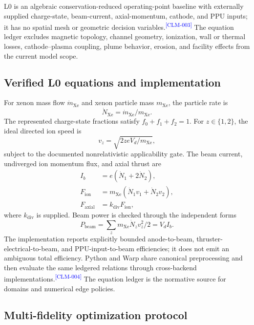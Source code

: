 \documentclass[11pt]{article}
\newcommand{\EvidenceClaim}[2]{#2\textsuperscript{\textcolor{blue}{[#1]}}}
\begin{document}
\EvidenceClaim{CLM-003}{L0 is an algebraic conservation-reduced operating-point
baseline with externally supplied charge-state, beam-current, axial-momentum,
cathode, and PPU inputs; it has no spatial mesh or geometric decision
variables.} The equation ledger excludes magnetic topology, channel geometry,
ionization, wall or thermal losses, cathode--plasma coupling, plume behavior,
erosion, and facility effects from the current model scope.

\subsection{Verified L0 equations and implementation}

For xenon mass flow $\dot m_{\mathrm{Xe}}$ and xenon particle mass
$m_{\mathrm{Xe}}$, the particle rate is
\begin{equation}
  \dot N_{\mathrm{Xe}} = \dot m_{\mathrm{Xe}}/m_{\mathrm{Xe}}.
\end{equation}
The represented charge-state fractions satisfy
$f_0+f_1+f_2=1$. For $z\in\{1,2\}$, the ideal directed ion speed is
\begin{equation}
  v_z = \sqrt{2 z e V_d/m_{\mathrm{Xe}}},
\end{equation}
subject to the documented nonrelativistic applicability gate. The beam current,
undiverged ion momentum flux, and axial thrust are
\begin{align}
  I_b &= e(\dot N_1+2\dot N_2),\\
  F_{\mathrm{ion}} &= m_{\mathrm{Xe}}
    (\dot N_1v_1+\dot N_2v_2),\\
  F_{\mathrm{axial}} &= k_{\mathrm{div}}F_{\mathrm{ion}},
\end{align}
where $k_{\mathrm{div}}$ is supplied. Beam power is checked through the
independent forms
\begin{equation}
  P_{\mathrm{beam}} =
  \sum_z m_{\mathrm{Xe}}\dot N_zv_z^2/2 = V_d I_b.
\end{equation}
The implementation reports explicitly bounded anode-to-beam,
thruster-electrical-to-beam, and PPU-input-to-beam efficiencies; it does not
emit an ambiguous total efficiency.
\EvidenceClaim{CLM-004}{Python and Warp share canonical preprocessing and then
evaluate the same ledgered relations through cross-backend implementations.}
The equation ledger is the normative source for domains and numerical edge
policies.

\subsection{Multi-fidelity optimization protocol}
\end{document}
